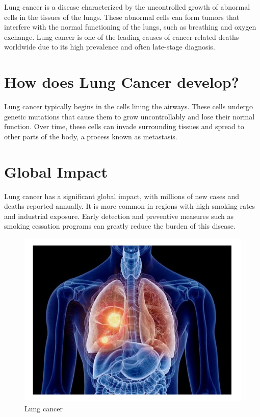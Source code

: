 Lung cancer is a disease characterized by the uncontrolled growth of abnormal cells in the tissues of the lungs. These abnormal cells can form tumors that interfere with the normal functioning of the lungs, such as breathing and oxygen exchange. Lung cancer is one of the leading causes of cancer-related deaths worldwide due to its high prevalence and often late-stage diagnosis.

\section{How does Lung Cancer develop?}
Lung cancer typically begins in the cells lining the airways. These cells undergo genetic mutations that cause them to grow uncontrollably and lose their normal function. Over time, these cells can invade surrounding tissues and spread to other parts of the body, a process known as metastasis.


\section{Global Impact}
Lung cancer has a significant global impact, with millions of new cases and deaths reported annually. It is more common in regions with high smoking rates and industrial exposure. Early detection and preventive measures such as smoking cessation programs can greatly reduce the burden of this disease.

\begin{figure}[h!]
    \centering
    \includegraphics[width= 0.85\linewidth]{images/lung_c.jpeg}
    \caption{Lung cancer}
    \label{fig:enter-label}
\end{figure}